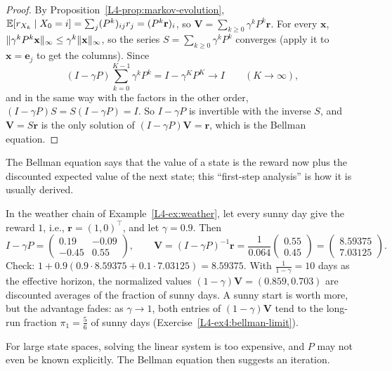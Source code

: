 \begin{proof}
    By Proposition~\ref{L4-prop:markov-evolution}, $\mathbb{E}[r_{X_k} \mid X_0 = i] = \sum_j (P^k)_{ij}r_j = (P^k\mathbf{r})_i$, so $\mathbf{V} = \sum_{k \geq 0}\gamma^kP^k\mathbf{r}$. For every $\mathbf{x}$, $\lVert \gamma^kP^k\mathbf{x} \rVert_\infty \leq \gamma^k\lVert \mathbf{x} \rVert_\infty$, so the series $S = \sum_{k \geq 0}\gamma^kP^k$ converges (apply it to $\mathbf{x} = \mathbf{e}_j$ to get the columns). Since
    \[(I - \gamma P)\sum_{k=0}^{K-1}\gamma^kP^k = I - \gamma^KP^K \to I \qquad (K \to \infty),\]
    and in the same way with the factors in the other order, $(I - \gamma P)S = S(I - \gamma P) = I$. So $I - \gamma P$ is invertible with the inverse $S$, and $\mathbf{V} = S\mathbf{r}$ is the only solution of $(I - \gamma P)\mathbf{V} = \mathbf{r}$, which is the Bellman equation.
\end{proof}

The Bellman equation says that the value of a state is the reward now plus the discounted expected value of the next state; this ``first-step analysis'' is how it is usually derived.

\begin{example}\label{L4-ex:bellman-weather}
    In the weather chain of Example~\ref{L4-ex:weather}, let every sunny day give the reward $1$, i.e., $\mathbf{r} = (1, 0)^\top$, and let $\gamma = 0.9$. Then
    \[I - \gamma P = \begin{pmatrix} 0.19 & -0.09 \\ -0.45 & 0.55 \end{pmatrix}, \qquad \mathbf{V} = (I - \gamma P)^{-1}\mathbf{r} = \frac{1}{0.064}\begin{pmatrix} 0.55 \\ 0.45 \end{pmatrix} = \begin{pmatrix} 8.59375 \\ 7.03125 \end{pmatrix}.\]
    Check: $1 + 0.9(0.9 \cdot 8.59375 + 0.1 \cdot 7.03125) = 8.59375$. With $\frac{1}{1 - \gamma} = 10$ days as the effective horizon, the normalized values $(1 - \gamma)\mathbf{V} = (0.859, 0.703)$ are discounted averages of the fraction of sunny days. A sunny start is worth more, but the advantage fades: as $\gamma \to 1$, both entries of $(1 - \gamma)\mathbf{V}$ tend to the long-run fraction $\pi_1 = \frac{5}{6}$ of sunny days (Exercise~\ref{L4-ex4:bellman-limit}).
\end{example}

For large state spaces, solving the linear system is too expensive, and $P$ may not even be known explicitly. The Bellman equation then suggests an iteration.

